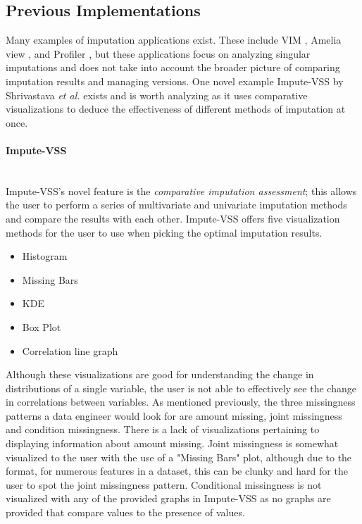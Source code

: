 \documentclass[a4paper, 11pt]{article}
\newcommand{\etal}{\textit{et al. }}
\begin{document}
\subsection{Previous Implementations}
Many examples of imputation applications exist. These include VIM
\cite{templ_exploring_2012}, Amelia view \cite{honaker_amelia_2024}, and
Profiler \cite{kandel_profiler_2012}, but these applications focus on analyzing
singular imputations and does not take into account the broader picture of
comparing imputation results and managing versions. One novel example
Impute-VSS \cite{shrivastava_impute-vss_2025} by Shrivastava \etal exists and
is worth analyzing as it uses comparative visualizations to deduce the
effectiveness of different methods of imputation at once.

\paragraph{\textbf{Impute-VSS}}~\\
Impute-VSS's novel feature is the \textit{comparative imputation assessment};
this allows the user to perform a series of multivariate and univariate
imputation methods and compare the results with each other. Impute-VSS offers
five visualization methods for the user to use when picking the optimal
imputation results.

\begin{itemize}
        \item Histogram
        \item Missing Bars
        \item KDE
        \item Box Plot
        \item Correlation line graph
\end{itemize}

Although these visualizations are good for understanding the change in
distributions of a single variable, the user is not able to effectively see the
change in correlations between variables. As mentioned previously, the three
missingness patterns a data engineer would look for are amount missing, joint
missingness and condition missingness. There is a lack of visualizations
pertaining to displaying information about amount missing. Joint missingness is
somewhat visualized to the user with the use of a "Missing Bars" plot, although
due to the format, for numerous features in a dataset, this can be clunky
and hard for the user to spot the joint missingness pattern. Conditional
missingness is not visualized with any of the provided graphs in Impute-VSS as
no graphs are provided that compare values to the presence of values.
\end{document}
